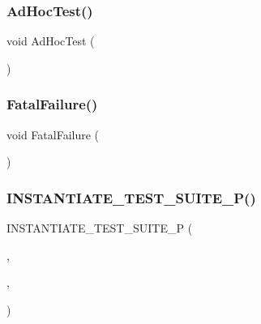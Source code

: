 \subsubsection{\texorpdfstring{AdHocTest()}{AdHocTest()}}
{\footnotesize\ttfamily void Ad\+Hoc\+Test (\begin{DoxyParamCaption}{ }\end{DoxyParamCaption})}

\mbox{\label{googletest-master_2googletest_2test_2googletest-output-test___8cc_acdca9b16622e8a506a39240c8809af38}} 
\subsubsection{\texorpdfstring{FatalFailure()}{FatalFailure()}}
{\footnotesize\ttfamily void Fatal\+Failure (\begin{DoxyParamCaption}{ }\end{DoxyParamCaption})}

\mbox{\label{googletest-master_2googletest_2test_2googletest-output-test___8cc_a7917783e750c5d42b4d0b6907c340c7e}} 
\subsubsection{\texorpdfstring{INSTANTIATE\_TEST\_SUITE\_P()}{INSTANTIATE\_TEST\_SUITE\_P()}\hspace{0.1cm}{\footnotesize\ttfamily [1/2]}}
{\footnotesize\ttfamily I\+N\+S\+T\+A\+N\+T\+I\+A\+T\+E\+\_\+\+T\+E\+S\+T\+\_\+\+S\+U\+I\+T\+E\+\_\+P (\begin{DoxyParamCaption}\item[{Printing\+Failing\+Params}]{,  }\item[{\mbox{\hyperlink{class_failing_param_test}{Failing\+Param\+Test}}}]{,  }\item[{\mbox{\hyperlink{namespacetesting_abd3c87b40c2a0663691c9b617ed5fcc2}{testing\+::\+Values}}(2)}]{ }\end{DoxyParamCaption})}

